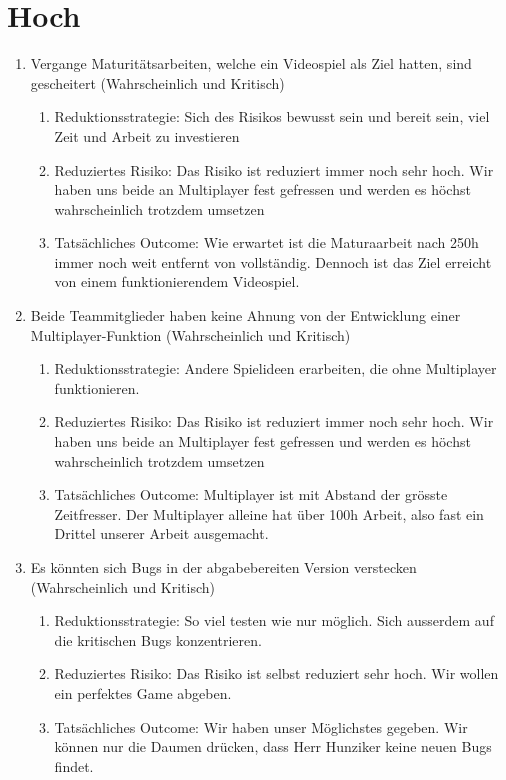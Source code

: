 \section{Hoch}
\begin{enumerate}
    \item Vergange Maturitätsarbeiten, welche ein Videospiel als Ziel hatten, sind gescheitert (Wahrscheinlich und Kritisch)
    \begin{enumerate}
        \item Reduktionsstrategie: Sich des Risikos bewusst sein und bereit sein, viel Zeit und Arbeit zu investieren
        \item Reduziertes Risiko: Das Risiko ist reduziert immer noch sehr hoch.
            Wir haben uns beide an Multiplayer fest gefressen und werden es höchst wahrscheinlich trotzdem umsetzen
        \item Tatsächliches Outcome: Wie erwartet ist die Maturaarbeit nach 250h immer noch weit entfernt von vollständig.
            Dennoch ist das Ziel erreicht von einem funktionierendem Videospiel.
    \end{enumerate}

    \item Beide Teammitglieder haben keine Ahnung von der Entwicklung einer Multiplayer-Funktion (Wahrscheinlich und Kritisch)
    \begin{enumerate}
        \item Reduktionsstrategie: Andere Spielideen erarbeiten, die ohne Multiplayer funktionieren.
        \item Reduziertes Risiko: Das Risiko ist reduziert immer noch sehr hoch.
              Wir haben uns beide an Multiplayer fest gefressen und werden es höchst wahrscheinlich trotzdem umsetzen
        \item Tatsächliches Outcome: Multiplayer ist mit Abstand der grösste Zeitfresser.
              Der Multiplayer alleine hat über 100h Arbeit, also fast ein Drittel unserer Arbeit ausgemacht.
    \end{enumerate}

    \item Es könnten sich Bugs in der abgabebereiten Version verstecken (Wahrscheinlich und Kritisch)
    \begin{enumerate}
        \item Reduktionsstrategie: So viel testen wie nur möglich. Sich ausserdem auf die kritischen Bugs konzentrieren. 
        \item Reduziertes Risiko: Das Risiko ist selbst reduziert sehr hoch. Wir wollen ein perfektes Game abgeben.
        \item Tatsächliches Outcome: Wir haben unser Möglichstes gegeben. Wir können nur die Daumen drücken, dass Herr Hunziker keine neuen Bugs findet.
    \end{enumerate}


\end{enumerate}
